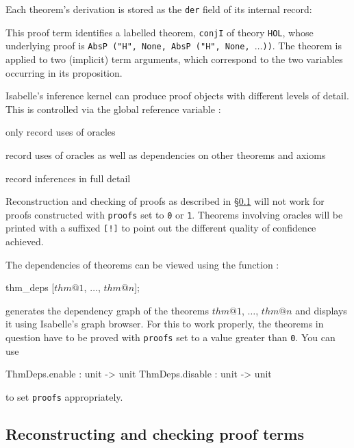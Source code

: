 Each theorem's derivation is stored as the {\tt der} field of its internal
record: 
This proof term identifies a labelled theorem, {\tt conjI} of theory
\texttt{HOL}, whose underlying proof is
{\tt AbsP ("H", None, AbsP ("H", None, $\dots$))}. 
The theorem is applied to two (implicit) term arguments, which correspond
to the two variables occurring in its proposition.

Isabelle's inference kernel can produce proof objects with different
levels of detail. This is controlled via the global reference variable
:
\begin{ttdescription}
\item[proofs := 0;] only record uses of oracles
\item[proofs := 1;] record uses of oracles as well as dependencies
  on other theorems and axioms
\item[proofs := 2;] record inferences in full detail
\end{ttdescription}
Reconstruction and checking of proofs as described in \S\ref{sec:reconstruct_proofs}
will not work for proofs constructed with {\tt proofs} set to
{\tt 0} or {\tt 1}.
Theorems involving oracles will be printed with a
suffixed \verb|[!]| to point out the different quality of confidence achieved.

\medskip

The dependencies of theorems can be viewed using the function
:
\begin{ttbox}
thm_deps [\(thm@1\), \(\ldots\), \(thm@n\)];
\end{ttbox}
generates the dependency graph of the theorems $thm@1$, $\ldots$, $thm@n$ and
displays it using Isabelle's graph browser. For this to work properly,
the theorems in question have to be proved with {\tt proofs} set to a value
greater than {\tt 0}. You can use
\begin{ttbox}
ThmDeps.enable : unit -> unit
ThmDeps.disable : unit -> unit
\end{ttbox}
to set \texttt{proofs} appropriately.

\subsection{Reconstructing and checking proof terms}\label{sec:reconstruct_proofs}

